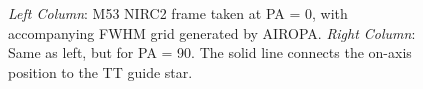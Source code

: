 \documentclass[]{spie}  %
\begin{document}
\begin{figure}[!htb]
 \caption{\footnotesize \textit{Left Column}: M53 NIRC2 frame taken at PA = 0, with accompanying FWHM grid generated by AIROPA. \textit{Right Column}: Same as left, but for PA = 90. The solid line connects the on-axis position to the TT guide star.} \label{fig:m53_image_grid}
\end{figure}
\end{document}
